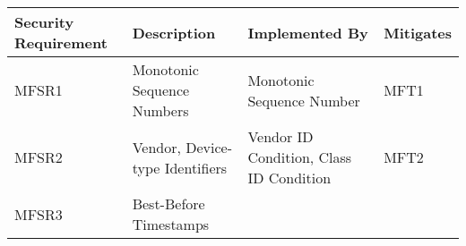 \begin{longtable}[]{@{}llll@{}}
\toprule
\begin{minipage}[b]{0.16\columnwidth}\raggedright\strut
Security Requirement\strut
\end{minipage} & \begin{minipage}[b]{0.29\columnwidth}\raggedright\strut
Description\strut
\end{minipage} & \begin{minipage}[b]{0.34\columnwidth}\raggedright\strut
Implemented By\strut
\end{minipage} & \begin{minipage}[b]{0.10\columnwidth}\raggedright\strut
Mitigates\strut
\end{minipage}\tabularnewline
\midrule
\endhead
\begin{minipage}[t]{0.16\columnwidth}\raggedright\strut
MFSR1\strut
\end{minipage} & \begin{minipage}[t]{0.29\columnwidth}\raggedright\strut
Monotonic Sequence Numbers\strut
\end{minipage} & \begin{minipage}[t]{0.34\columnwidth}\raggedright\strut
Monotonic Sequence Number\strut
\end{minipage} & \begin{minipage}[t]{0.10\columnwidth}\raggedright\strut
MFT1\strut
\end{minipage}\tabularnewline
\begin{minipage}[t]{0.16\columnwidth}\raggedright\strut
MFSR2\strut
\end{minipage} & \begin{minipage}[t]{0.29\columnwidth}\raggedright\strut
Vendor, Device-type Identifiers\strut
\end{minipage} & \begin{minipage}[t]{0.34\columnwidth}\raggedright\strut
Vendor ID Condition, Class ID Condition\strut
\end{minipage} & \begin{minipage}[t]{0.10\columnwidth}\raggedright\strut
MFT2\strut
\end{minipage}\tabularnewline
\begin{minipage}[t]{0.16\columnwidth}\raggedright\strut
MFSR3\strut
\end{minipage} & \begin{minipage}[t]{0.29\columnwidth}\raggedright\strut
Best-Before Timestamps\strut
\end{minipage} & \begin{minipage}[t]{0.34\columnwidth}\raggedright\strut

\end{minipage}
\end{longtable}
